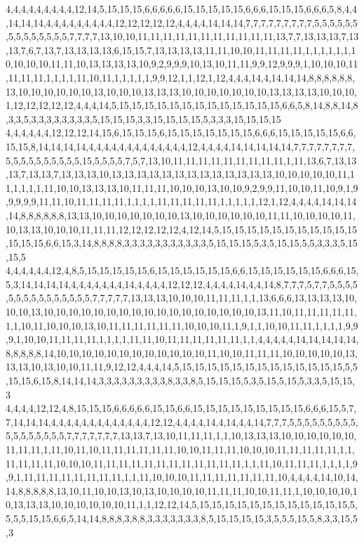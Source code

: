 4,4,4,4,4,4,4,4,4,12,14,5,15,15,15,6,6,6,6,6,15,15,15,15,15,6,6,6,15,15,15,6,6,6,5,8,4,4,14,14,14,4,4,4,4,4,4,4,4,4,12,12,12,12,12,4,4,4,4,14,14,14,7,7,7,7,7,7,7,7,7,5,5,5,5,5,5,5,5,5,5,5,5,5,5,7,7,7,7,13,10,10,11,11,11,11,11,11,11,11,11,11,11,13,7,7,13,13,13,7,13,13,7,6,7,13,7,13,13,13,13,6,15,15,7,13,13,13,13,11,11,10,10,11,11,11,11,1,1,1,1,1,1,10,10,10,10,11,11,10,13,13,13,13,10,9,2,9,9,9,10,13,10,11,11,9,9,12,9,9,9,1,10,10,10,11,11,11,11,1,1,1,1,11,10,11,1,1,1,1,1,9,9,12,1,1,12,1,12,4,4,4,14,4,14,14,14,8,8,8,8,8,8,13,10,10,10,10,10,10,13,10,10,10,13,13,13,10,10,10,10,10,10,10,13,13,13,13,10,10,10,1,12,12,12,12,12,4,4,4,14,5,15,15,15,15,15,15,15,15,15,15,15,15,15,6,6,5,8,14,8,8,14,8,3,3,5,3,3,3,3,3,3,3,3,5,15,15,15,3,3,15,15,15,15,5,3,3,3,15,15,15,15
4,4,4,4,4,4,12,12,12,14,15,6,15,15,15,6,15,15,15,15,15,15,15,6,6,6,15,15,15,15,15,6,6,15,15,8,14,14,14,14,4,4,4,4,4,4,4,4,4,4,4,4,4,12,4,4,4,4,14,14,14,14,14,7,7,7,7,7,7,7,7,5,5,5,5,5,5,5,5,5,5,15,5,5,5,5,7,5,7,13,10,11,11,11,11,11,11,11,11,11,1,11,13,6,7,13,13,13,7,13,13,7,13,13,13,10,13,13,13,13,13,13,13,13,13,13,13,13,13,10,10,10,10,10,11,11,1,1,1,1,11,10,10,13,13,13,10,11,11,11,10,10,10,13,10,10,9,2,9,9,11,10,10,11,10,9,1,9,9,9,9,9,11,11,10,11,11,11,11,1,1,1,1,11,11,11,11,11,1,1,1,1,1,12,1,12,4,4,4,4,14,14,14,14,8,8,8,8,8,8,13,13,10,10,10,10,10,10,10,13,10,10,10,10,10,10,11,11,10,10,10,10,11,10,13,13,10,10,10,11,11,11,12,12,12,12,12,4,12,14,5,15,15,15,15,15,15,15,15,15,15,15,15,15,15,6,6,15,3,14,8,8,8,8,3,3,3,3,3,3,3,3,3,3,3,5,15,15,15,5,3,5,15,15,5,5,3,3,3,5,15,15,5
4,4,4,4,4,4,12,4,8,5,15,15,15,15,15,6,15,15,15,15,15,15,6,6,15,15,15,15,15,15,6,6,6,15,5,3,14,14,14,14,4,4,4,4,4,4,4,14,4,4,4,4,12,12,12,4,4,4,4,14,4,4,14,8,7,7,7,5,7,7,5,5,5,5,5,5,5,5,5,5,5,5,5,5,5,7,7,7,7,7,13,13,13,10,10,10,11,11,11,1,1,13,6,6,6,13,13,13,13,10,10,10,13,10,10,10,10,10,10,10,10,10,10,10,10,10,10,10,10,10,13,11,10,11,11,11,11,11,1,1,10,11,10,10,10,13,10,11,11,11,11,11,11,10,10,10,11,1,9,1,1,10,10,11,11,1,1,1,1,9,9,9,1,10,10,11,11,11,11,1,1,1,1,11,11,10,11,11,11,11,11,11,1,1,4,4,4,4,4,14,14,14,14,14,8,8,8,8,8,14,10,10,10,10,10,10,10,10,10,10,10,10,11,10,10,11,11,11,10,10,10,10,10,13,13,13,10,13,10,10,11,11,9,12,12,4,4,4,14,5,15,15,15,15,15,15,15,15,15,15,15,15,15,5,5,15,15,6,15,8,14,14,14,3,3,3,3,3,3,3,3,3,8,3,3,8,5,15,15,15,5,3,5,15,5,15,5,3,3,5,15,15,3
4,4,4,4,12,12,4,8,15,15,15,6,6,6,6,6,15,15,6,6,15,15,15,15,15,15,15,15,15,6,6,6,15,5,7,7,14,14,14,4,4,4,4,4,4,4,4,4,4,4,4,4,12,12,4,4,4,4,14,4,14,4,4,14,7,7,7,5,5,5,5,5,5,5,5,5,5,5,5,5,5,5,5,5,7,7,7,7,7,7,7,13,13,7,13,10,11,11,11,1,1,10,13,13,13,10,10,10,10,10,10,11,11,11,1,11,10,11,10,11,11,11,11,11,11,10,10,11,11,11,10,10,10,11,11,11,11,11,1,1,11,11,11,11,10,10,10,11,11,11,11,11,11,11,11,11,11,11,11,1,1,11,10,11,11,11,1,1,1,1,9,9,1,11,11,11,11,11,11,11,11,1,1,11,10,10,10,11,11,11,11,11,11,11,10,4,4,4,4,14,10,14,14,8,8,8,8,8,13,10,11,10,10,13,10,13,10,10,10,10,11,11,11,10,10,11,11,1,10,10,10,10,10,13,13,13,10,10,10,10,10,10,11,1,1,12,12,14,5,15,15,15,15,15,15,15,15,15,15,15,15,5,5,5,5,15,15,6,6,5,14,14,8,8,8,3,8,8,3,3,3,3,3,3,3,8,5,15,15,15,15,3,5,5,5,15,5,8,3,3,15,5,3
